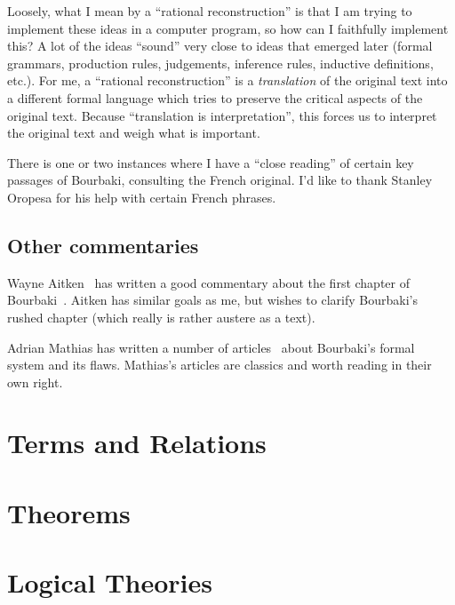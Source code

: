 \documentclass{amsart}
\begin{document}
Loosely, what I mean by a ``rational reconstruction'' is that I am
trying to implement these ideas in a computer program, so how can I
faithfully implement this? A lot of the ideas ``sound'' very close to
ideas that emerged later (formal grammars, production rules, judgements,
inference rules, inductive definitions, etc.). For me, a ``rational reconstruction''
is a \emph{translation} of the original text into a different formal
language which tries to preserve the critical aspects of the original
text. Because ``translation is interpretation'', this forces us to
interpret the original text and weigh what is important.

There is one or two instances where I have a ``close reading'' of
certain key passages of Bourbaki, consulting the French original. I'd
like to thank Stanley Oropesa for his help with certain French phrases. 

\subsection{Other commentaries}
Wayne Aitken~\cite{aitken2023} has written a good commentary about the
first chapter of Bourbaki~\cite{bourbaki1970sets}. Aitken has similar
goals as me, but wishes to clarify Bourbaki's rushed chapter (which
really is rather austere as a text).

Adrian Mathias has written a number of articles~\cite{mathias1992ignorance,mathias2002term,mathias2014hilbert}
about Bourbaki's formal system and its flaws. Mathias's articles are
classics and worth reading in their own right.

\section{Terms and Relations}






\section{Theorems}





\section{Logical Theories}





\end{document}
